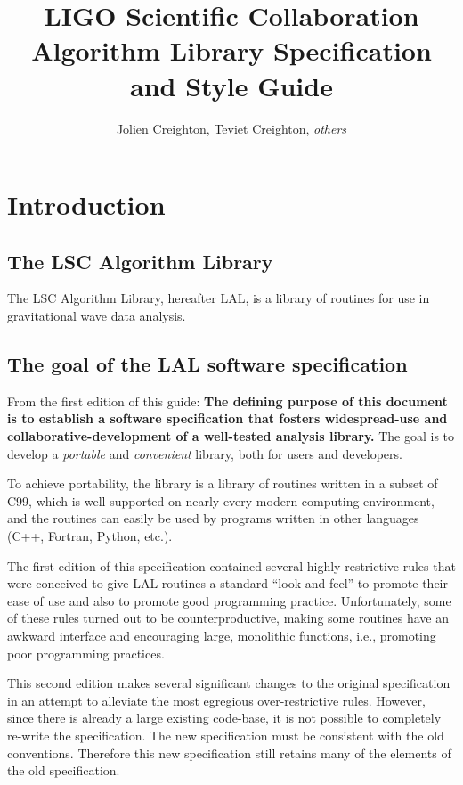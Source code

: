\documentclass[10pt]{ligodcc}
\title{LIGO Scientific Collaboration Algorithm Library Specification and Style
Guide}
\author{Jolien Creighton, Teviet Creighton, \emph{others}}
\begin{document}
\maketitle


\tableofcontents


\section{Introduction}
\label{s:intro}


\subsection{The LSC Algorithm Library}

The LSC Algorithm Library, hereafter LAL, is a library of routines for use in
gravitational wave data analysis.


\subsection{The goal of the LAL software specification}

From the first edition of this guide: \textbf{The defining purpose of this
document is to establish a software specification that fosters widespread-use
and collaborative-development of a well-tested analysis library.}  The goal is
to develop a \emph{portable} and \emph{convenient} library, both for users and
developers.

To achieve portability, the library is a library of routines written in a
subset of C99, which is well supported on nearly every modern computing
environment, and the routines can easily be used by programs written in
other languages (C++, Fortran, Python, etc.).

The first edition of this specification contained several highly restrictive
rules that were conceived to give LAL routines a standard ``look and feel''
to promote their ease of use and also to promote good programming practice.
Unfortunately, some of these rules turned out to be counterproductive, making
some routines have an awkward interface and encouraging large, monolithic
functions, i.e., promoting poor programming practices.

This second edition makes several significant changes to the original
specification in an attempt to alleviate the most egregious over-restrictive
rules.  However, since there is already a large existing code-base, it is
not possible to completely re-write the specification.  The new specification
must be consistent with the old conventions.  Therefore this new specification
still retains many of the elements of the old specification.
\end{document}
